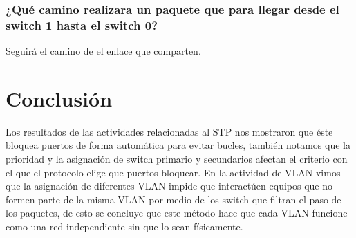 ﻿\documentclass[spanish]{udpreport}
\begin{document}
\subsection{¿Qué camino realizara un paquete que para llegar desde el switch 1 hasta el switch 0?}

Seguirá el camino de el enlace que comparten.

\chapter{Conclusión}
Los resultados de las actividades relacionadas al STP nos mostraron que éste bloquea puertos de forma automática para evitar bucles, también notamos que la prioridad y la asignación de switch primario y secundarios afectan el criterio con el que el protocolo elige que puertos bloquear. En la actividad de VLAN  vimos que la asignación de diferentes VLAN impide que interactúen equipos que no formen parte de la misma VLAN por medio de los switch que filtran el paso de los paquetes, de esto se concluye que este método hace que cada VLAN funcione como una red independiente sin que lo sean físicamente.

\listoffigures
\end{document}
